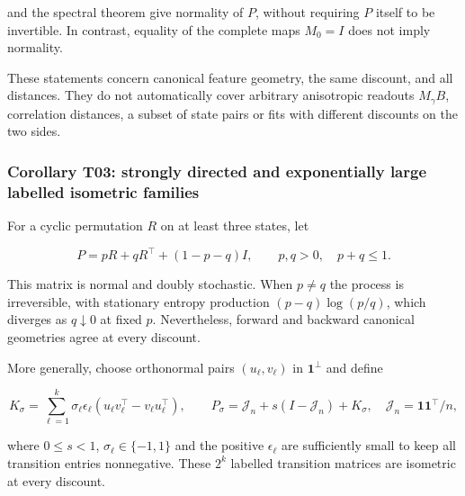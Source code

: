 \documentclass[11pt,a4paper]{article}
\begin{document}
and the spectral theorem give normality of \(P\), without requiring
\(P\) itself to be invertible. In contrast, equality of the complete
maps \(M_0=I\) does not imply normality.

These statements concern canonical feature geometry, the same discount,
and all distances. They do not automatically cover arbitrary anisotropic
readouts \(M_\gamma B\), correlation distances, a subset of state pairs
or fits with different discounts on the two sides.

\subsubsection{Corollary T03: strongly directed and exponentially large
labelled isometric
families}\label{corollary-t03-strongly-directed-and-exponentially-large-labelled-isometric-families}

\par
\noindent\begin{minipage}{\linewidth}

For a cyclic permutation \(R\) on at least three states, let

\[
P=pR+qR^\top+(1-p-q)I,\qquad
p,q>0,\quad p+q\le1.
\]

\end{minipage}\par

This matrix is normal and doubly stochastic. When \(p\ne q\) the process
is irreversible, with stationary entropy production \((p-q)\log(p/q)\),
which diverges as \(q\downarrow0\) at fixed \(p\). Nevertheless, forward
and backward canonical geometries agree at every discount.

\par
\noindent\begin{minipage}{\linewidth}

More generally, choose orthonormal pairs \((u_\ell,v_\ell)\) in
\(\mathbf1^\perp\) and define

\[
K_\sigma=\sum_{\ell=1}^k\sigma_\ell\epsilon_\ell
(u_\ell v_\ell^\top-v_\ell u_\ell^\top),\qquad
P_\sigma=\mathcal J_n+s(I-\mathcal J_n)+K_\sigma,
\quad \mathcal J_n=\mathbf1\mathbf1^\top/n,
\]

\end{minipage}\par

where \(0\le s<1\), \(\sigma_\ell\in\{-1,1\}\) and the positive
\(\epsilon_\ell\) are sufficiently small to keep all transition entries
nonnegative. These \(2^k\) labelled transition matrices are isometric at
every discount.
\end{document}
